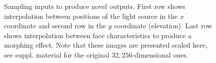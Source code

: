 \begin{figure}[ht]
\begin{center}
\vspace{-8pt}
\newline
{}
\end{center}
\caption{
Sampling inputs to produce novel outputs.
First row shows interpolation between positions of the light source in the $x$ coordinate
and second row in the $y$ coordinate (elevation). Last row shows interpolation between
face characteristics to produce a morphing effect. Note that these images are presented scaled here, see suppl. material for the original $32,256$-dimensional ones.
}
\label{fig:yale6SetsInterpolation}
\end{figure}


